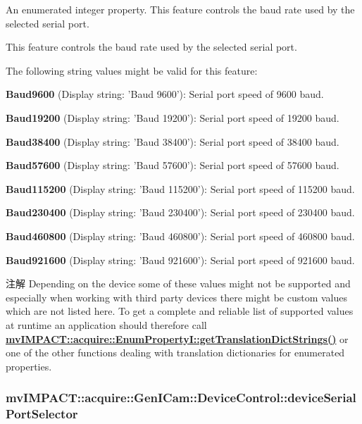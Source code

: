 An enumerated integer property. This feature controls the baud rate used by the selected serial port. 

This feature controls the baud rate used by the selected serial port.

The following string values might be valid for this feature\+:
\begin{DoxyItemize}
\item {\bfseries Baud9600} (Display string\+: 'Baud 9600')\+: Serial port speed of 9600 baud.
\item {\bfseries Baud19200} (Display string\+: 'Baud 19200')\+: Serial port speed of 19200 baud.
\item {\bfseries Baud38400} (Display string\+: 'Baud 38400')\+: Serial port speed of 38400 baud.
\item {\bfseries Baud57600} (Display string\+: 'Baud 57600')\+: Serial port speed of 57600 baud.
\item {\bfseries Baud115200} (Display string\+: 'Baud 115200')\+: Serial port speed of 115200 baud.
\item {\bfseries Baud230400} (Display string\+: 'Baud 230400')\+: Serial port speed of 230400 baud.
\item {\bfseries Baud460800} (Display string\+: 'Baud 460800')\+: Serial port speed of 460800 baud.
\item {\bfseries Baud921600} (Display string\+: 'Baud 921600')\+: Serial port speed of 921600 baud.
\end{DoxyItemize}

\begin{DoxyNote}{注解}
Depending on the device some of these values might not be supported and especially when working with third party devices there might be custom values which are not listed here. To get a complete and reliable list of supported values at runtime an application should therefore call {\bfseries \hyperlink{classmv_i_m_p_a_c_t_1_1acquire_1_1_enum_property_i_a0ba6ccbf5ee69784d5d0b537924d26b6}{mv\+I\+M\+P\+A\+C\+T\+::acquire\+::\+Enum\+Property\+I\+::get\+Translation\+Dict\+Strings()}} or one of the other functions dealing with translation dictionaries for enumerated properties. 
\end{DoxyNote}
\hypertarget{classmv_i_m_p_a_c_t_1_1acquire_1_1_gen_i_cam_1_1_device_control_aff5c54a3673e4ccdbe44380b0ac7dbcc}{
\subsubsection[{device\+Serial\+Port\+Selector}]{ mv\+I\+M\+P\+A\+C\+T\+::acquire\+::\+Gen\+I\+Cam\+::\+Device\+Control\+::device\+Serial\+Port\+Selector}}\label{classmv_i_m_p_a_c_t_1_1acquire_1_1_gen_i_cam_1_1_device_control_aff5c54a3673e4ccdbe44380b0ac7dbcc}



